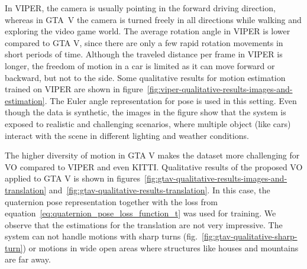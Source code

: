 		In VIPER, the camera is usually pointing in the forward driving direction, whereas in \mbox{GTA V} the camera is turned freely in all directions while walking and exploring the video game world.
		The average rotation angle in VIPER is lower compared to GTA V, since there are only a few rapid rotation movements in short periods of time.
		Although the traveled distance per frame in VIPER is longer, the freedom of motion in a car is limited as it can move forward or backward, but not to the side.
		Some qualitative results for motion estimation trained on VIPER are shown in figure~\ref{fig:viper-qualitative-results-images-and-estimation}.
		The Euler angle representation for pose is used in this setting.
		Even though the data is synthetic, the images in the figure show that the system is exposed to realistic and challenging scenarios, where multiple object (like cars) interact with the scene in different lighting and weather conditions.
		
		The higher diversity of motion in GTA V makes the dataset more challenging for VO compared to VIPER and even KITTI.
		Qualitative results of the proposed VO applied to GTA V is shown in figures~\ref{fig:gtav-qualitative-results-images-and-translation} and~\ref{fig:gtav-qualitative-results-translation}.
		In this case, the quaternion pose representation together with the loss from equation~\ref{eq:quaternion_pose_loss_function_t} was used for training.
		We observe that the estimations for the translation are not very impressive.
		The system can not handle motions with sharp turns (fig.\@~\ref{fig:gtav-qualitative-sharp-turn}) or motions in wide open areas where structures like houses and mountains are far away.
		
